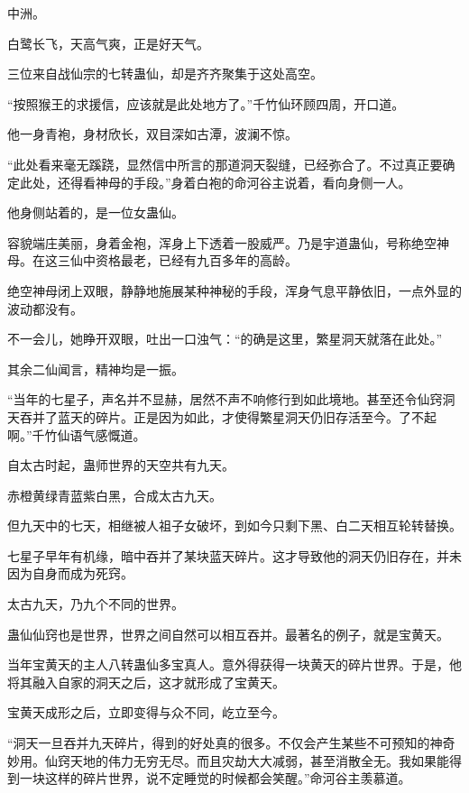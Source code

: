
\begin{this_body}



中洲。

白鹭长飞，天高气爽，正是好天气。

三位来自战仙宗的七转蛊仙，却是齐齐聚集于这处高空。

“按照猴王的求援信，应该就是此处地方了。”千竹仙环顾四周，开口道。

他一身青袍，身材欣长，双目深如古潭，波澜不惊。

“此处看来毫无蹊跷，显然信中所言的那道洞天裂缝，已经弥合了。不过真正要确定此处，还得看神母的手段。”身着白袍的命河谷主说着，看向身侧一人。

他身侧站着的，是一位女蛊仙。

容貌端庄美丽，身着金袍，浑身上下透着一股威严。乃是宇道蛊仙，号称绝空神母。在这三仙中资格最老，已经有九百多年的高龄。

绝空神母闭上双眼，静静地施展某种神秘的手段，浑身气息平静依旧，一点外显的波动都没有。

不一会儿，她睁开双眼，吐出一口浊气：“的确是这里，繁星洞天就落在此处。”

其余二仙闻言，精神均是一振。

“当年的七星子，声名并不显赫，居然不声不响修行到如此境地。甚至还令仙窍洞天吞并了蓝天的碎片。正是因为如此，才使得繁星洞天仍旧存活至今。了不起啊。”千竹仙语气感慨道。

自太古时起，蛊师世界的天空共有九天。

赤橙黄绿青蓝紫白黑，合成太古九天。

但九天中的七天，相继被人祖子女破坏，到如今只剩下黑、白二天相互轮转替换。

七星子早年有机缘，暗中吞并了某块蓝天碎片。这才导致他的洞天仍旧存在，并未因为自身而成为死窍。

太古九天，乃九个不同的世界。

蛊仙仙窍也是世界，世界之间自然可以相互吞并。最著名的例子，就是宝黄天。

当年宝黄天的主人八转蛊仙多宝真人。意外得获得一块黄天的碎片世界。于是，他将其融入自家的洞天之后，这才就形成了宝黄天。

宝黄天成形之后，立即变得与众不同，屹立至今。

“洞天一旦吞并九天碎片，得到的好处真的很多。不仅会产生某些不可预知的神奇妙用。仙窍天地的伟力无穷无尽。而且灾劫大大减弱，甚至消散全无。我如果能得到一块这样的碎片世界，说不定睡觉的时候都会笑醒。”命河谷主羡慕道。


\end{this_body}
